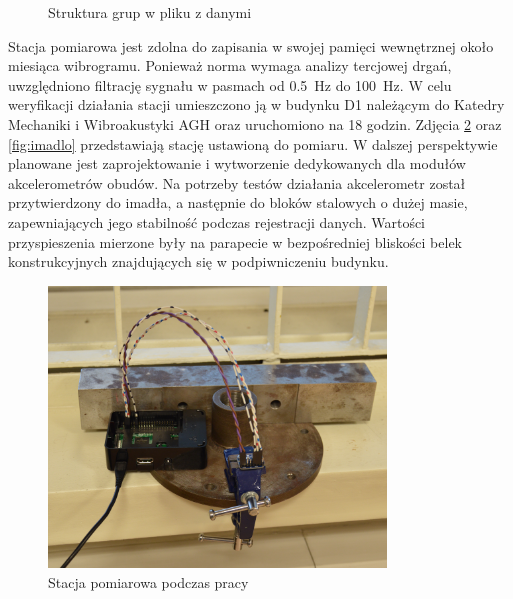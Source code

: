 \documentclass[a4paper,12pt]{mwart}
\begin{document}
\begin{figure}[!tbh]%
  \centering%
  \begin{minipage}{0.3\textwidth}%
  \end{minipage}%
  \caption{Struktura grup w pliku z danymi}%
  \label{fig:struc}%
\end{figure}%

Stacja pomiarowa jest zdolna do zapisania w swojej pamięci wewnętrznej około
miesiąca wibrogramu. Ponieważ norma wymaga analizy tercjowej drgań, uwzględniono
filtrację sygnału w pasmach od \SI{0,5}{\hertz} do \SI{100}{\hertz}. W celu
weryfikacji działania stacji umieszczono ją w budynku D1 należącym do Katedry
Mechaniki i Wibroakustyki AGH oraz uruchomiono na 18 godzin. Zdjęcia
\ref{fig:pomiar1} oraz \ref{fig:imadlo} przedstawiają stację ustawioną do
pomiaru. W dalszej perspektywie planowane jest zaprojektowanie i wytworzenie
dedykowanych dla modułów akcelerometrów obudów. Na potrzeby testów działania
akcelerometr został przytwierdzony do imadła, a następnie do bloków stalowych o
dużej masie, zapewniających jego stabilność podczas rejestracji danych. Wartości
przyspieszenia mierzone były na parapecie w bezpośredniej bliskości belek
konstrukcyjnych znajdujących się w podpiwniczeniu budynku.

\begin{figure}[!tbh]
  \centering
  \includegraphics[width=0.8\textwidth]{bitgraphics/pom_2_cut.jpg}
  \caption{Stacja pomiarowa podczas pracy}
  \label{fig:pomiar1}
\end{figure}
\end{document}
